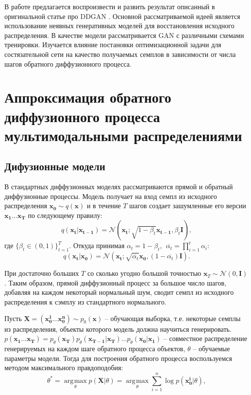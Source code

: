 \documentclass{article}
\DeclareMathOperator*{\argmax}{\arg\!\max}
\begin{document}
 В работе предлагается воспроизвести и развить результат описанный в оригинальной статье про DDGAN \cite{https://doi.org/10.48550/arxiv.2112.07804}. Основной рассматриваемой идеей является использование неявных генеративных моделей для восстановления исходного распределения. В качестве модели рассматривается GAN с различными схемами тренировки. Изучается влияние постановки оптимизационной задачи для состязательной сети на качество получаемых семплов в зависимости от числа шагов обратного диффузионного процесса.
 
 
 \section{Аппроксимация обратного диффузионного процесса мультимодальными распределениями}
 \subsection{Дифузионные модели}
 В стандартных диффузионных моделях \cite{https://doi.org/10.48550/arxiv.1503.03585, https://doi.org/10.48550/arxiv.2006.11239} рассматриваются прямой и обратный диффузионные процессы. Модель получает на вход семпл из исходного распределения $\mathbf{x_0}\sim q(\mathbf{x})$ и в течение $T$ шагов создает зашумленные его версии $\mathbf{x_1}\dots \mathbf{x_T}$ по следующему правилу:
 \begin{equation}
 	q(\mathbf{x_t}|\mathbf{x_{t-1}}) = \mathcal{N}(\mathbf{x_t}; \sqrt{1-\beta_t}\mathbf{x_{t-1}}, \beta_t \mathbf{I}),
 \end{equation}
где $\{\beta_t \in (0, 1)\}_{t=1}^T$. Откуда принимая $\alpha_t = 1 - \beta_t,~~\overline{\alpha_t} = \prod_{i=1}^t \alpha_i$:
 \begin{equation}
	q(\mathbf{x_t}|\mathbf{x_0}) = \mathcal{N}(\mathbf{x_t}; \sqrt{\overline{\alpha_t}}\mathbf{x_0}, (1-\overline{\alpha_t})\mathbf{I}).
\end{equation}

При достаточно больших $T$ со сколько угодно большой точностью $\mathbf{x}_T\sim \mathcal{N}(0,\mathbf{I})$. Таким образом, прямой диффузионный процесс за большое число шагов, добавляя на каждом некоторый нормальный шум, сводит семпл из исходного распределения к сэмплу из стандартного нормального. 

Пусть $\mathbf{X} = (\mathbf{x_0^1}\dots \mathbf{x_0^n})\sim p_0(\mathbf{x})$ -- обучающая выборка, т.е. некоторые семплы из распределения, объекты которого модель должна научиться генерировать. $p(\mathbf{x_1}\dots \mathbf{x_T}) = p_\theta(\mathbf{x_T})p_\theta(\mathbf{x_{T-1}}|\mathbf{x_T})\dots p_\theta(\mathbf{x_0}|\mathbf{x_1})$ -- совместное распределение генерируемых на каждом шаге обратного процесса объектов, $\theta$ -- обучаемые параметры модели. Тогда для построения обратного процесса воспользуемся методом максимального правдоподобия:
 \begin{equation}
	\theta^* =\argmax\limits_{\theta} p(\mathbf{X}|\theta) = \argmax\limits_{\theta} \sum\limits_{i=1}^n \log{p(\mathbf{x_0^i}|\theta)},
\end{equation}
\end{document}
